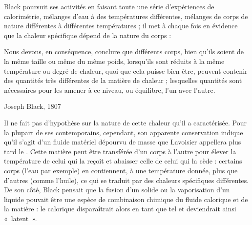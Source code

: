 	Black poursuit ses activités en faisant toute une série d'expériences de calorimétrie, mélanges d'eau à des températures différentes, mélanges de corps de nature différentes à différentes températures ; il met à chaque fois en évidence que la chaleur spécifique dépend de la nature du corps :
	
	\onlyframabook{\begin{quote}}%
	\onlyamphibook{\begin{historyquote}}
		Nous devons, en conséquence, conclure que différents corps, bien qu’ils soient de la même taille ou même du même poids, lorsqu’ils sont réduits à la même température ou degré de chaleur, quoi que cela puisse bien être, peuvent contenir des quantités très différentes de la matière de chaleur ; lesquelles quantités sont nécessaires pour les amener à ce niveau, ou équilibre, l’un avec l’autre.
	\begin{flushright}\vspace{-0.5em}Joseph Black, 1807~\cite{black1807}\end{flushright}
	\onlyamphibook{\end{historyquote}}
	\onlyframabook{\end{quote}}

	Il ne fait pas d'hypothèse sur la nature de cette chaleur qu'il a caractérisée. Pour la plupart de ses contemporains, cependant, son apparente conservation indique qu'il s'agit d'un fluide matériel dépourvu de masse que Lavoisier appellera plus tard le . Cette matière peut être transférée d'un corps à l'autre pour élever la température de celui qui la reçoit et abaisser celle de celui qui la cède : certains corps (l'eau par exemple) en contiennent, à une température donnée, plus que d'autres (comme l'huile), ce qui se traduit par des chaleurs spécifiques différentes. De son côté, Black pensait que la fusion d'un solide ou la vaporisation d'un liquide pouvait être une espèce de combinaison chimique du fluide calorique et de la matière : le calorique disparaîtrait alors en tant que tel et deviendrait ainsi «~latent~».

